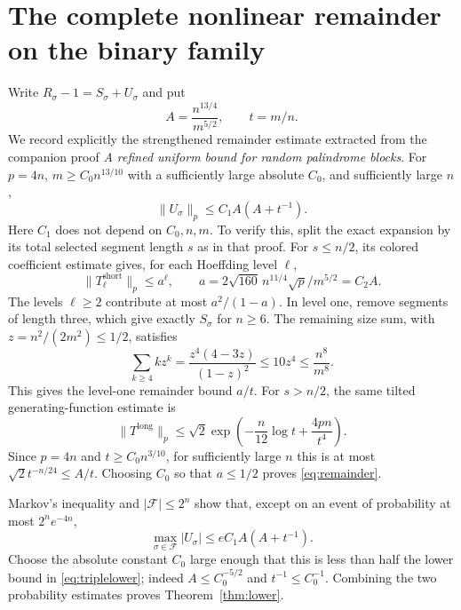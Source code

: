 \documentclass[11pt]{article}
\begin{document}
\section{The complete nonlinear remainder on the binary family}
Write $R_\sigma-1=S_\sigma+U_\sigma$ and put
\[
 A=\frac{n^{13/4}}{m^{5/2}},\qquad t=m/n.
\]
We record explicitly the strengthened remainder estimate extracted from
the companion proof \emph{A refined uniform bound for random palindrome
blocks}.
For $p=4n$, $m\geq C_0 n^{13/10}$ with a sufficiently large absolute
$C_0$, and sufficiently large $n$,
\begin{equation}\label{eq:remainder}
 \|U_\sigma\|_p\leq C_1 A(A+t^{-1}).
\end{equation}
Here $C_1$ does not depend on $C_0,n,m$. To verify this, split the exact
expansion by its total selected segment length $s$ as in that proof.
For $s\leq n/2$, its colored coefficient estimate gives, for each
Hoeffding level $\ell$,
\[
 \|T_\ell^{\mathrm{short}}\|_p\leq a^\ell,
 \qquad a=2\sqrt{160}\,n^{11/4}\sqrt p/m^{5/2}=C_2 A.
\]
The levels $\ell\geq2$ contribute at most $a^2/(1-a)$.
In level one, remove segments of length three, which give exactly
$S_\sigma$ for $n\geq6$. The remaining size sum, with
$z=n^2/(2m^2)\leq1/2$, satisfies
\[
 \sum_{k\geq4}kz^k
 =\frac{z^4(4-3z)}{(1-z)^2}\leq10z^4
 \leq\frac{n^8}{m^8}.
\]
This gives the level-one remainder bound $a/t$.
For $s>n/2$, the same tilted generating-function estimate is
\[
 \|T^{\mathrm{long}}\|_p
 \leq\sqrt2\exp\left(-\frac n{12}\log t+\frac{4pn}{t^4}\right).
\]
Since $p=4n$ and $t\geq C_0 n^{3/10}$, for sufficiently large $n$ this is
at most $\sqrt2t^{-n/24}\leq A/t$.
Choosing $C_0$ so that $a\leq1/2$ proves \eqref{eq:remainder}.

Markov's inequality and $|\mathcal F|\leq2^n$ show that, except on an
event of probability at most $2^ne^{-4n}$,
\[
 \max_{\sigma\in\mathcal F}|U_\sigma|
 \leq eC_1 A(A+t^{-1}).
\]
Choose the absolute constant $C_0$ large enough that this is less than
half the lower bound in \eqref{eq:triplelower}; indeed
$A\leq C_0^{-5/2}$ and $t^{-1}\leq C_0^{-1}$.
Combining the two probability estimates proves Theorem~\ref{thm:lower}.
\end{document}
